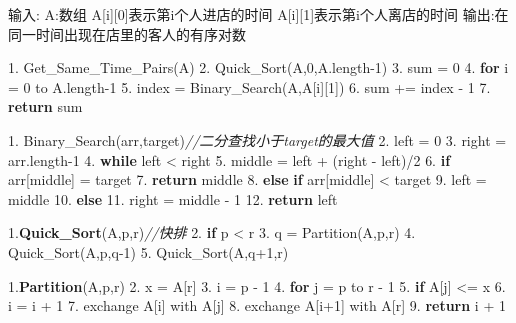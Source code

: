 \documentclass[
]{ctexart}
\newenvironment{Shaded}{}{}
\newcommand{\CommentTok}[1]{\textcolor[rgb]{0.38,0.63,0.69}{\textit{#1}}}
\newcommand{\ControlFlowTok}[1]{\textcolor[rgb]{0.00,0.44,0.13}{\textbf{#1}}}
\newcommand{\DecValTok}[1]{\textcolor[rgb]{0.25,0.63,0.44}{#1}}
\newcommand{\ErrorTok}[1]{\textcolor[rgb]{1.00,0.00,0.00}{\textbf{#1}}}
\newcommand{\FloatTok}[1]{\textcolor[rgb]{0.25,0.63,0.44}{#1}}
\newcommand{\NormalTok}[1]{#1}
\begin{document}
\begin{Shaded}
\begin{Highlighting}[]
\NormalTok{输入:}
\NormalTok{A:数组}
\NormalTok{  A[i][}\DecValTok{0}\NormalTok{]表示第i个人进店的时间}
\NormalTok{  A[i][}\DecValTok{1}\NormalTok{]表示第i个人离店的时间}
\NormalTok{输出:在同一时间出现在店里的客人的有序对数}
  
\FloatTok{1.}\NormalTok{ Get\_Same\_Time\_Pairs(A)}
\FloatTok{2.}\NormalTok{ 	Quick\_Sort(A,}\DecValTok{0}\NormalTok{,A.length{-}}\DecValTok{1}\NormalTok{)}
\FloatTok{3.}\NormalTok{   sum = }\DecValTok{0}
\FloatTok{4.}   \ControlFlowTok{for}\NormalTok{ i = }\DecValTok{0}\NormalTok{ to A.length{-}}\DecValTok{1}
\FloatTok{5.}\NormalTok{     index = Binary\_Search(A,A[i][}\DecValTok{1}\NormalTok{])}
\FloatTok{6.}\NormalTok{     sum += index {-} }\DecValTok{1}
\FloatTok{7.}   \ControlFlowTok{return}\NormalTok{ sum}
  

\FloatTok{1.}\NormalTok{ Binary\_Search(arr,target)}\CommentTok{//二分查找小于target的最大值}
\FloatTok{2.}\NormalTok{   left = }\DecValTok{0}
\FloatTok{3.}\NormalTok{   right = arr.length{-}}\DecValTok{1}
\FloatTok{4.}   \ControlFlowTok{while}\NormalTok{ left \textless{} right}
\FloatTok{5.}\NormalTok{     middle = left + (right {-} left)/}\DecValTok{2}
\FloatTok{6.}     \ControlFlowTok{if}\NormalTok{ arr[middle] = target}
\FloatTok{7.}       \ControlFlowTok{return}\NormalTok{ middle}
\FloatTok{8.}     \ControlFlowTok{else} \ControlFlowTok{if}\NormalTok{ arr[middle] \textless{} target}
\FloatTok{9.}\NormalTok{       left = middle}
\FloatTok{10.}    \ControlFlowTok{else}
\FloatTok{11.}\NormalTok{      right = middle {-} }\DecValTok{1}
\FloatTok{12.}  \ControlFlowTok{return}\NormalTok{ left}
      
\FloatTok{1.}\ErrorTok{Quick\_Sort}\NormalTok{(A,p,r)}\CommentTok{//快排}
\FloatTok{2.}	\ControlFlowTok{if}\NormalTok{ p \textless{} r}
\FloatTok{3.}\NormalTok{    q = Partition(A,p,r)}
\FloatTok{4.}\NormalTok{    Quick\_Sort(A,p,q{-}}\DecValTok{1}\NormalTok{)}
\FloatTok{5.}\NormalTok{    Quick\_Sort(A,q+}\DecValTok{1}\NormalTok{,r)}
    
\FloatTok{1.}\ErrorTok{Partition}\NormalTok{(A,p,r)}
\FloatTok{2.}\NormalTok{  x = A[r]}
\FloatTok{3.}\NormalTok{  i = p {-} }\DecValTok{1}
\FloatTok{4.}  \ControlFlowTok{for}\NormalTok{ j = p to r {-} }\DecValTok{1}
\FloatTok{5.}    \ControlFlowTok{if}\NormalTok{ A[j] \textless{}= x}
\FloatTok{6.}\NormalTok{      i = i + }\DecValTok{1}
\FloatTok{7.}\NormalTok{      exchange A[i] with A[j]}
\FloatTok{8.}\NormalTok{  exchange A[i+}\DecValTok{1}\NormalTok{] with A[r]}
\FloatTok{9.}  \ControlFlowTok{return}\NormalTok{ i + }\DecValTok{1}
\end{Highlighting}
\end{Shaded}
\end{document}
